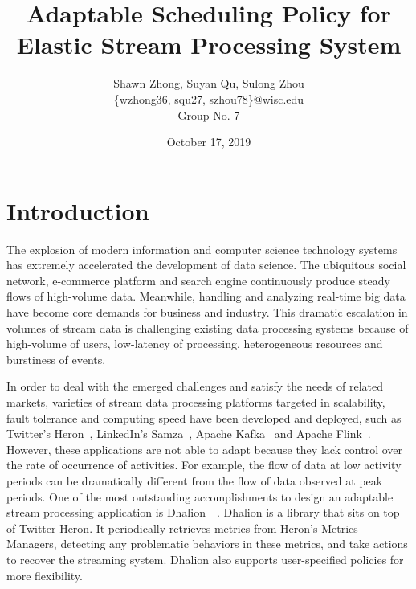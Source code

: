 \documentclass[pdftex,twocolumn,10pt,letterpaper]{article}
\begin{document}
\title{Adaptable Scheduling Policy for Elastic Stream Processing System }
\author{
    Shawn Zhong, Suyan Qu, Sulong Zhou \\
    \{wzhong36, squ27, szhou78\}@wisc.edu\\
    Group No. 7
}
\date{October 17, 2019}


\maketitle

\section{Introduction}

The explosion of modern information and computer science technology systems has extremely accelerated the development of data science. The ubiquitous social network, e-commerce platform and search engine continuously produce steady flows of high-volume data. Meanwhile, handling and analyzing real-time big data have become core demands for business and industry. This dramatic escalation in volumes of stream data is challenging existing data processing systems because of high-volume of users, low-latency of processing, heterogeneous resources and burstiness of events.  

In order to deal with the emerged challenges and satisfy the needs of related markets, varieties of stream data processing platforms targeted in scalability, fault tolerance and computing speed have been developed and deployed, such as Twitter’s Heron~\cite{Kulkarni:2015:THS:2723372.2742788}, LinkedIn’s Samza~\cite{Noghabi:2017:SSS:3137765.3137770}, Apache Kafka~\cite{kreps2011kafka} and Apache Flink~\cite{Carbone2015ApacheFS}. However, these applications are not able to adapt because they lack control over the rate of occurrence of activities. For example, the flow of data at low activity periods can be dramatically different from the flow of data observed at peak periods. One of the most outstanding accomplishments to design an adaptable stream processing application is Dhalion~\cite{Agrawal:2018:DAA:3229863.3275594}~\cite{Floratou:2017:DSS:3137765.3137786}. Dhalion is a library that sits on top of Twitter Heron. It periodically retrieves metrics from Heron's Metrics Managers, detecting any problematic behaviors in these metrics, and take actions to recover the streaming system. Dhalion also supports user-specified policies for more flexibility. 
\end{document}
